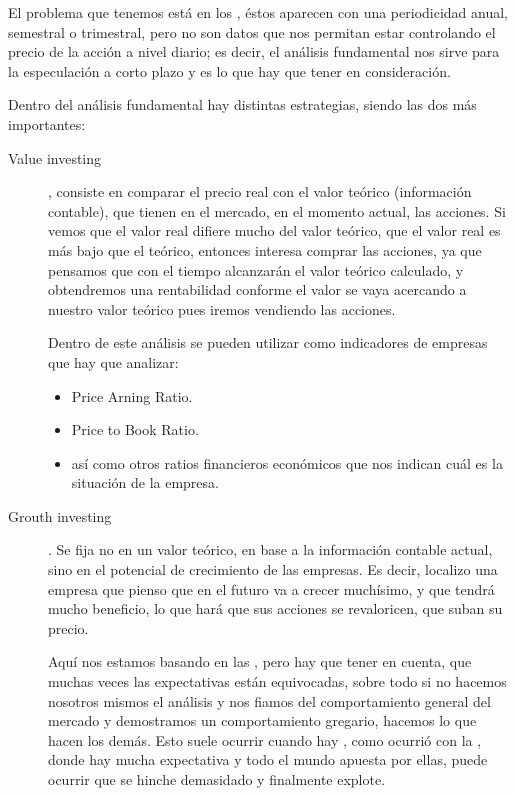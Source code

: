 El problema que tenemos está en los , éstos aparecen con una periodicidad anual, semestral o trimestral, pero no son datos que nos permitan estar controlando el precio de la acción a nivel diario; es decir, el análisis fundamental nos sirve para la especulación a corto plazo y es lo que hay que tener en consideración.

Dentro del análisis fundamental hay distintas estrategias, siendo las dos más importantes:

\begin{description}
    \item[Value investing], consiste en comparar el precio real con el valor teórico (información contable), que tienen en el mercado, en el momento actual, las acciones. Si vemos que el valor real difiere mucho del valor teórico, que el valor real es más bajo que el teórico, entonces interesa comprar las acciones, ya que pensamos que con el tiempo alcanzarán el valor teórico calculado, y obtendremos una rentabilidad conforme el valor se vaya acercando a nuestro valor teórico pues iremos vendiendo las acciones.
    
    Dentro de este análisis se pueden utilizar como indicadores de empresas que hay que analizar:
    \begin{itemize}
        \item Price Arning Ratio.
        \item Price to Book Ratio.
        \item así como otros ratios financieros económicos que nos indican cuál es la situación de la empresa.
    \end{itemize}

    \item[Grouth investing]. Se fija no en un valor teórico, en base a la información contable actual, sino en el potencial de crecimiento de las empresas. Es decir, localizo una empresa que pienso que en el futuro va a crecer muchísimo, y que tendrá mucho beneficio, lo que hará que sus acciones se revaloricen, que suban su precio.
    
    Aquí nos estamos basando en las , pero hay que tener en cuenta, que muchas veces las expectativas están equivocadas, sobre todo si no hacemos nosotros mismos el análisis y nos fiamos del comportamiento general del mercado y demostramos un comportamiento gregario, hacemos lo que hacen los demás. Esto suele ocurrir cuando hay , como ocurrió con la , donde hay mucha expectativa y todo el mundo apuesta por ellas, puede ocurrir que se hinche demasidado y finalmente explote.
\end{description}
